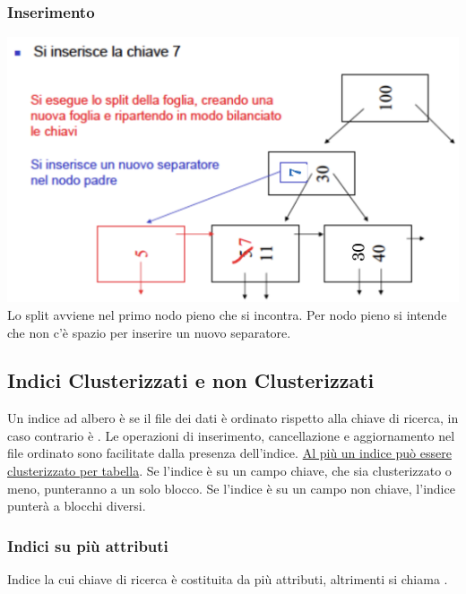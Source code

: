 \documentclass[12pt, a4paper]{report}
\begin{document}
    \subsubsection{Inserimento}
    \includegraphics[width=\textwidth]{Appunti Latex/Immagini/inserimento.png}
Lo split avviene nel primo nodo pieno che si incontra. Per nodo pieno si intende che non c'è spazio per inserire un nuovo separatore.
    \subsection{Indici Clusterizzati e non Clusterizzati}
    Un indice ad albero è  se il file dei dati è ordinato rispetto alla chiave di ricerca, in caso contrario è . Le operazioni di inserimento, cancellazione e aggiornamento nel file ordinato sono facilitate dalla presenza dell'indice. \underline{Al più un indice può essere clusterizzato per tabella}. Se l'indice è su un campo chiave, che sia clusterizzato o meno, punteranno a un solo blocco. Se l'indice è su un campo non chiave, l'indice punterà a blocchi diversi.
    \subsubsection{Indici su più attributi}
    Indice la cui chiave di ricerca è costituita da più attributi, altrimenti si chiama .
\end{document}
